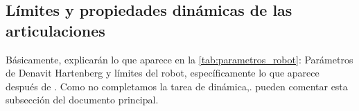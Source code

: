 \subsection{Límites y propiedades dinámicas de las articulaciones} \label{subsec:limites_propiedades}

Básicamente, explicarán lo que aparece en la \autoref{tab:parametros_robot}: Parámetros de Denavit Hartenberg y límites del robot, específicamente lo que aparece después de . Como no completamos la tarea de dinámica,. pueden comentar esta subsección del documento principal.